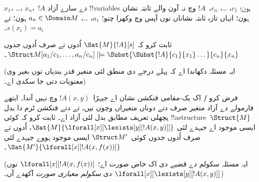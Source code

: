 \documentclass[../../../include/open-logic-section]{subfiles}
\begin{document}
\begin{prob}
\begin{enumerate}

\end{enumerate}
$x_1$، \dots، $x_n$،~$!A$ دے سارے آزاد !!{variable}s ہون؛
$c_1$، \dots، $c_n$،~$!A$ وچ نہ آون والے ثابتہ نشان ہون؛
انہاں تازہ ثابتہ نشاناں نوں آپس وچ وکھرا چنو؛
$a_1$، \dots، $a_n \in \Domain M$ ہون؛ تے $s(x_i) = a_i$۔

ثابت کرو کہ $\Sat{M}{!A}[s]$ اُدوں تے صرف اُدوں جدوں
$\Struct M[a_1/c_1,\dots,a_n/c_n]
\VDash \Subst{\Subst{!A}{c_1}{x_1}\dots}{c_n}{x_n}$۔

(ایہ مسئلہ دکھاندا اے کہ پہلے درجے دی منطق لئی متغیر قدر بندیاں
توں بغیر وی معنویات دتی جا سکدی اے۔)
\end{prob}

\begin{prob}
فرض کرو $f$ اک یک-مقامی فنکشن نشان اے جیہڑا~$!A(x,y)$ وچ نہیں آندا۔
ایتھے فارمولے دے آزاد متغیر صرف دتے دوناں متغیراں وچوں نیں،
تے دتے فنکشن ٹرم دا بدل پچھلی تعریف مطابق بدل لئی آزاد اے۔
ثابت کرو کہ کوئی !!a{structure}~$\Struct{M}$ ایسی موجود اے جیہدے لئی
$\Sat{M}{\lforall[x][\lexists[y][!A(x,y)]]}$، اُدوں تے صرف اُدوں
جدوں کوئی~$\Struct M'$ ایسی موجود ہووے جیہدے لئی
$\Sat{M'}{\lforall[x][!A(x,f(x))]}$۔

(ایہ مسئلہ سکولم دے قضیے دی اک خاص صورت اے؛
$\lforall[x][!A(x,f(x))]$ نوں
$\lforall[x][\lexists[y][!A(x,y)]]$ دی \emph{سکولم معیاری صورت}
آکھدے آں۔)
\end{prob}
\end{document}

